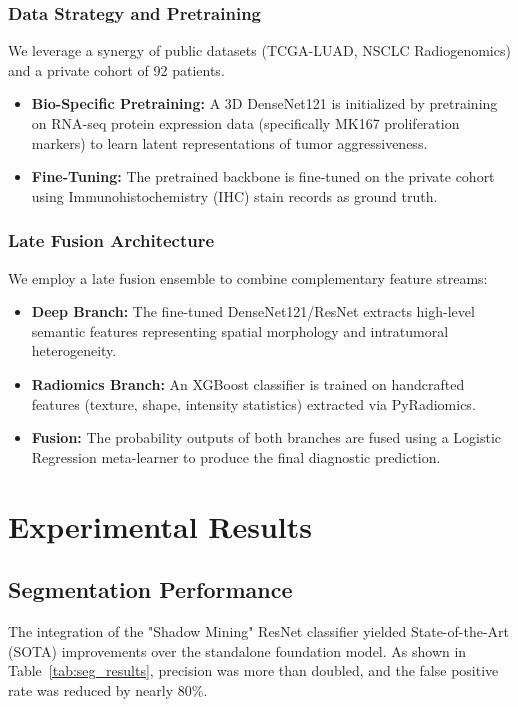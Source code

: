 \documentclass[10pt, twocolumn, letterpaper]{article}
\begin{document}
\subsubsection{Data Strategy and Pretraining}
We leverage a synergy of public datasets (TCGA-LUAD, NSCLC Radiogenomics) and a private cohort of 92 patients.
\begin{itemize}
    \item \textbf{Bio-Specific Pretraining:} A 3D DenseNet121 is initialized by pretraining on RNA-seq protein expression data (specifically MK167 proliferation markers) to learn latent representations of tumor aggressiveness.
    \item \textbf{Fine-Tuning:} The pretrained backbone is fine-tuned on the private cohort using Immunohistochemistry (IHC) stain records as ground truth.
\end{itemize}

\subsubsection{Late Fusion Architecture}
We employ a late fusion ensemble to combine complementary feature streams:
\begin{itemize}
    \item \textbf{Deep Branch:} The fine-tuned DenseNet121/ResNet extracts high-level semantic features representing spatial morphology and intratumoral heterogeneity.
    \item \textbf{Radiomics Branch:} An XGBoost classifier is trained on handcrafted features (texture, shape, intensity statistics) extracted via PyRadiomics.
    \item \textbf{Fusion:} The probability outputs of both branches are fused using a Logistic Regression meta-learner to produce the final diagnostic prediction.
\end{itemize}

\section{Experimental Results}

\subsection{Segmentation Performance}
The integration of the "Shadow Mining" ResNet classifier yielded State-of-the-Art (SOTA) improvements over the standalone foundation model. As shown in Table~\ref{tab:seg_results}, precision was more than doubled, and the false positive rate was reduced by nearly 80\%.
\end{document}
